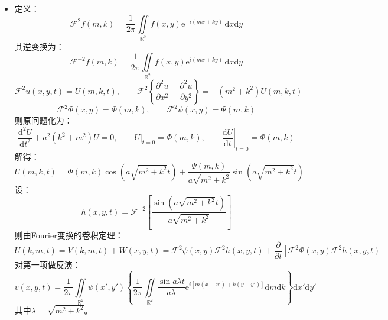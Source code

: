 \documentclass[a4paper,fontset=windows]{ctexart}
\begin{document}
\begin{itemize}
则：
\begin{align*}
u(x,t)
&= \frac{A}{\sin\alpha l}\sin\alpha(l-x)\mathrm{e}^{-\alpha^2\kappa t} + \frac{B}{\sin\beta l}\sin\beta x\mathrm{e}^{-\beta^2\kappa t} \\
&\quad + \sum_{n=1}^{\infty}2n\pi\left[\frac{A}{(\alpha l)^2-(n\pi)^2} - \frac{(-1)^nB}{(\beta l)^2-(n\pi)^2}\right]\left(\sin\frac{n\pi}{l}x\right)\mathrm{e}^{-\left(\tfrac{n\pi}{l}\right)^{2}\kappa t}
\end{align*}

\bigskip
\item[5.]
定义：
\[
\mathscr{F}^{2}f(m,k) = \frac{1}{2\pi}\iint\limits_{\mathbb{R}^2} f(x,y)\mathrm{e}^{-i(mx+ky)}\,\mathrm{d}x\mathrm{d}y
\]
其逆变换为：
\[
\mathscr{F}^{-2}f(m,k) = \frac{1}{2\pi}\iint\limits_{\mathbb{R}^2} f(x,y)\mathrm{e}^{i(mx+ky)}\,\mathrm{d}x\mathrm{d}y
\]
\[
\mathscr{F}^{2}u(x,y,t) = U(m,k,t),\qquad \mathscr{F}^{2}\left\{\frac{\partial^2 u}{\partial x^2} + \frac{\partial^2 u}{\partial y^2}\right\} = -\left(m^2+k^2\right)U(m,k,t)
\]
\[
\mathscr{F}^{2}\varPhi(x,y) = \varPhi(m,k),\qquad \mathscr{F}^{2}\psi(x,y) = \Psi(m,k)
\]
则原问题化为：
\[
\frac{\mathrm{d}^2U}{\mathrm{d}t^2} + a^2\left(k^2+m^2\right)U = 0,\qquad \left.U\right|_{t = 0} = \varPhi(m,k),\qquad \left.\frac{\mathrm{d}U}{\mathrm{d}t}\right|_{t = 0} = \varPhi(m,k)
\]
解得：
\[
U(m,k,t) = \varPhi(m,k)\cos\left(a\sqrt{m^2+k^2}t\right) + \frac{\Psi(m,k)}{a\sqrt{m^2+k^2}}\sin\left(a\sqrt{m^2+k^2}t\right)
\]
设：
\[
h(x,y,t) = \mathscr{F}^{-2}\left[\frac{\sin\left(a\sqrt{m^2+k^2}t\right)}{a\sqrt{m^2+k^2}}\right]
\]
则由Fourier变换的卷积定理：
\[
U(k,m,t) = V(k,m,t) + W(x,y,t) = \mathscr{F}^{2}\psi(x,y)\mathscr{F}^{2}h(x,y,t) + \frac{\partial}{\partial t}\left[\mathscr{F}^{2}\varPhi(x,y)\mathscr{F}^{2}h(x,y,t)\right]
\]
对第一项做反演：
\[
v(x,y,t) = \frac{1}{2\pi}\iint\limits_{\mathbb{R}^2}\psi(x',y')\left\{\frac{1}{2\pi}\iint\limits_{\mathbb{R}^2}\frac{\sin{a\lambda t}}{a\lambda}\mathrm{e}^{i\left[m(x-x')+k(y-y')\right]}\mathrm{d}m\mathrm{d}k\right\}\mathrm{d}x'\mathrm{d}y'
\]
其中$\lambda = \sqrt{m^2+k^2}$。


\end{itemize}
\end{document}
